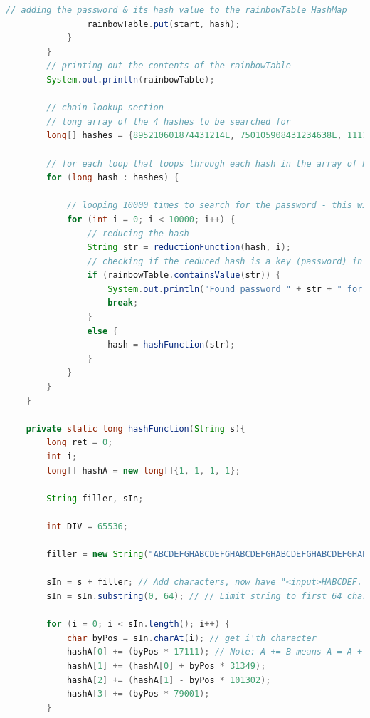 \documentclass[a4paper]{article}
\begin{document}
\begin{lstlisting}[language=java]
                // adding the password & its hash value to the rainbowTable HashMap
                rainbowTable.put(start, hash);
            }
        }
        // printing out the contents of the rainbowTable
        System.out.println(rainbowTable);

        // chain lookup section
        // long array of the 4 hashes to be searched for
        long[] hashes = {895210601874431214L, 750105908431234638L, 111111111115664932L, 977984261343652499L};

        // for each loop that loops through each hash in the array of hashes
        for (long hash : hashes) {

            // looping 10000 times to search for the password - this will function as our max number of iterations, as 10000 iterations should just take use back to where we started.
            for (int i = 0; i < 10000; i++) {
                // reducing the hash
                String str = reductionFunction(hash, i);
                // checking if the reduced hash is a key (password) in the rainbowTable HashMap
                if (rainbowTable.containsValue(str)) {
                    System.out.println("Found password " + str + " for hash value " +  hash);   // printing the found password
                    break;                                                                      // breaking out of the for loop
                }
                else {
                    hash = hashFunction(str);                                                   // hashing str before continuing the for loop
                }
            }
        }
	}
        
    private static long hashFunction(String s){
        long ret = 0;
        int i;
        long[] hashA = new long[]{1, 1, 1, 1};
        
        String filler, sIn;
        
        int DIV = 65536;
        
        filler = new String("ABCDEFGHABCDEFGHABCDEFGHABCDEFGHABCDEFGHABCDEFGHABCDEFGHABCDEFGH");
        
        sIn = s + filler; // Add characters, now have "<input>HABCDEF..."
        sIn = sIn.substring(0, 64); // // Limit string to first 64 characters

        for (i = 0; i < sIn.length(); i++) {
            char byPos = sIn.charAt(i); // get i'th character
            hashA[0] += (byPos * 17111); // Note: A += B means A = A + B
            hashA[1] += (hashA[0] + byPos * 31349);
            hashA[2] += (hashA[1] - byPos * 101302);
            hashA[3] += (byPos * 79001);
        } 
           

\end{lstlisting}
\end{document}
